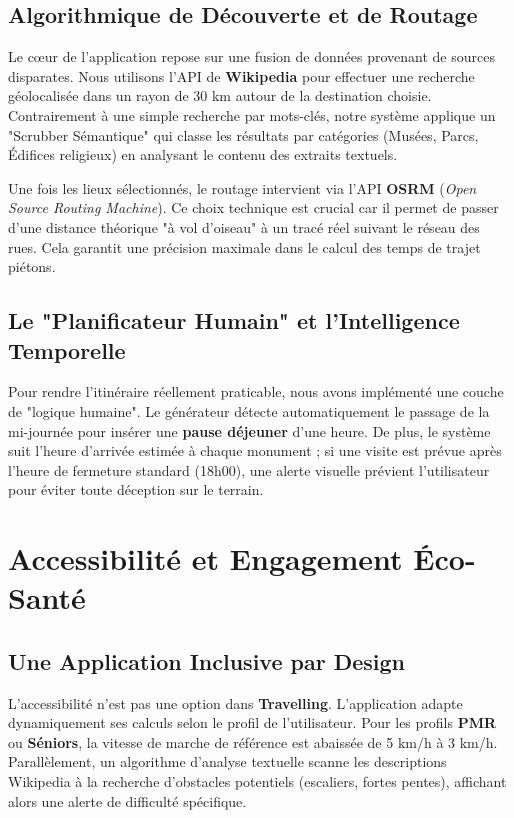\documentclass[12pt,a4paper]{article}
\begin{document}
\subsection{Algorithmique de Découverte et de Routage}
Le cœur de l'application repose sur une fusion de données provenant de sources disparates. Nous utilisons l'API de \textbf{Wikipedia} pour effectuer une recherche géolocalisée dans un rayon de 30 km autour de la destination choisie. Contrairement à une simple recherche par mots-clés, notre système applique un "Scrubber Sémantique" qui classe les résultats par catégories (Musées, Parcs, Édifices religieux) en analysant le contenu des extraits textuels.

Une fois les lieux sélectionnés, le routage intervient via l'API \textbf{OSRM} (\textit{Open Source Routing Machine}). Ce choix technique est crucial car il permet de passer d'une distance théorique "à vol d'oiseau" à un tracé réel suivant le réseau des rues. Cela garantit une précision maximale dans le calcul des temps de trajet piétons.

\subsection{Le "Planificateur Humain" et l'Intelligence Temporelle}
Pour rendre l'itinéraire réellement praticable, nous avons implémenté une couche de "logique humaine". Le générateur détecte automatiquement le passage de la mi-journée pour insérer une \textbf{pause déjeuner} d'une heure. De plus, le système suit l'heure d'arrivée estimée à chaque monument ; si une visite est prévue après l'heure de fermeture standard (18h00), une alerte visuelle prévient l'utilisateur pour éviter toute déception sur le terrain.

\section{Accessibilité et Engagement Éco-Santé}
\subsection{Une Application Inclusive par Design}
L'accessibilité n'est pas une option dans \textbf{Travelling}. L'application adapte dynamiquement ses calculs selon le profil de l'utilisateur. Pour les profils \textbf{PMR} ou \textbf{Séniors}, la vitesse de marche de référence est abaissée de 5 km/h à 3 km/h. Parallèlement, un algorithme d'analyse textuelle scanne les descriptions Wikipedia à la recherche d'obstacles potentiels (escaliers, fortes pentes), affichant alors une alerte de difficulté spécifique.
\end{document}
